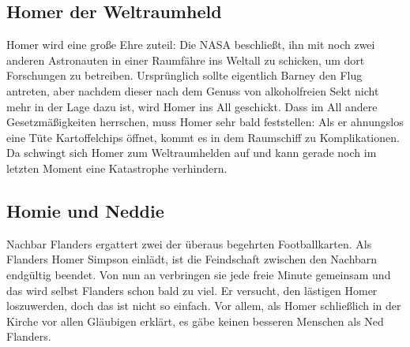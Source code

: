	
\subsection{Homer der Weltraumheld}\label{1F13}
Homer wird eine große Ehre zuteil: Die NASA beschließt, ihn mit noch zwei anderen Astronauten in einer Raumfähre ins Weltall zu schicken, um dort Forschungen zu betreiben. Ursprünglich sollte eigentlich Barney den Flug antreten, aber nachdem dieser nach dem Genuss von alkoholfreien Sekt nicht mehr in der Lage dazu ist, wird Homer ins All geschickt. Dass im All andere Gesetzmäßigkeiten herrschen, muss Homer sehr bald feststellen: Als er ahnungslos eine Tüte Kartoffelchips öffnet, kommt es in dem Raumschiff zu Komplikationen. Da schwingt sich Homer zum Weltraumhelden auf und kann gerade noch im letzten Moment eine Katastrophe verhindern.

	
\subsection{Homie und Neddie}
Nachbar Flanders ergattert zwei der überaus begehrten Footballkarten. Als Flanders Homer Simpson einlädt, ist die Feindschaft zwischen den Nachbarn endgültig beendet. Von nun an verbringen sie jede freie Minute gemeinsam und das wird selbst Flanders schon bald zu viel. Er versucht, den lästigen Homer loszuwerden, doch das ist nicht so einfach. Vor allem, als Homer schließlich in der Kirche vor allen Gläubigen erklärt, es gäbe keinen besseren Menschen als Ned Flanders.

